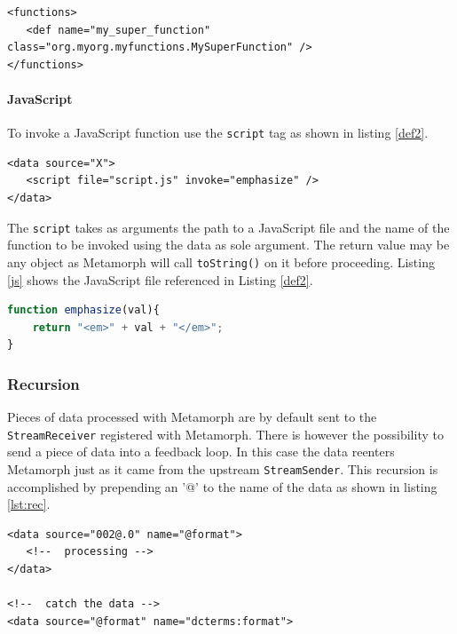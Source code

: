 \documentclass[12pt,a4paper]{article}
\begin{document}
\begin{lstlisting}[float=htb, label=def,caption=User defined functions in Java.]
<functions>
   <def name="my_super_function" class="org.myorg.myfunctions.MySuperFunction" />
</functions> 
\end{lstlisting}

\paragraph{JavaScript}

To invoke a JavaScript function use the {\tt script} tag as shown in listing \ref{def2}. 
\begin{lstlisting}[float=htb, label=def2,caption=User defined functions in JavaScript.]
<data source="X">
   <script file="script.js" invoke="emphasize" />
</data>
\end{lstlisting}
The {\tt script} takes as arguments the path to a JavaScript file and the name of the function to be invoked using the data as sole argument. The return value may be any object as Metamorph will call {\tt toString()} on it before proceeding. Listing \ref{js} shows the JavaScript file referenced in Listing \ref{def2}.

\begin{lstlisting}[float=htb, label=js, language=JavaScript, caption=JavaScript file implementing the function referenced in listing \ref{def2}.]
function emphasize(val){
	return "<em>" + val + "</em>";
}
\end{lstlisting}

\subsubsection{Recursion}\label{recursion}

Pieces of data processed with Metamorph are by default sent to the {\tt StreamReceiver} registered with Metamorph. There is however the possibility to send a piece of data into a feedback loop. In this case the data reenters Metamorph just as it came from the upstream {\tt StreamSender}. This recursion is accomplished by prepending an '@' to the name of the data as shown in listing \ref{lst:rec}. 

\begin{lstlisting}[float=htb,label=lst:rec,caption=Prepending '@' to the literal name to enable recursive processing.]
<data source="002@.0" name="@format">
   <!--  processing -->
</data>

<!--  catch the data -->
<data source="@format" name="dcterms:format">
\end{lstlisting}
\end{document}

